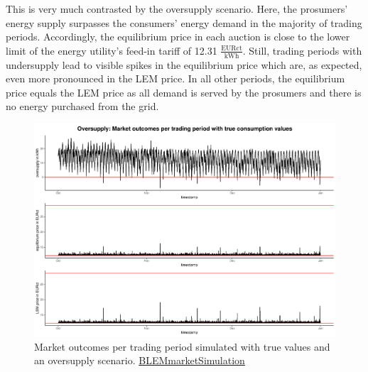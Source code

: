 This is very much contrasted by the oversupply scenario. Here, the prosumers' energy supply surpasses the consumers' energy demand in the majority of trading periods. Accordingly, the equilibrium price in each auction is close to the lower limit of the energy utility's feed-in tariff of 12.31 $\frac{\text{EURct}}{\text{kWh}}$. Still, trading periods with undersupply lead to visible spikes in the equilibrium price which are, as expected, even more pronounced in the LEM price. In all other periods, the equilibrium price equals the LEM price as all demand is served by the prosumers and there is no energy purchased from the grid.
%
\begin{figure}[htbp]
    \centering
    \includegraphics[width=\textwidth]{thesis/graphs/marketsimulation/marketoutcome_true_oversupply.pdf}
    \caption[Market outcomes simulated with oversupply and true values]{Market outcomes per trading period simulated with true values and an oversupply scenario. \quantnet\href{https://github.com/QuantLet/BLEM/tree/master/BLEMmarketSimulation}{BLEMmarketSimulation}}
    \label{Fig:marketoutcomes_true_over}
\end{figure}
%

